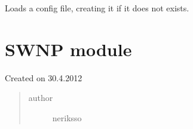 \documentclass[letterpaper,10pt,english]{sphinxmanual}
\begin{document}

\begin{fulllineitems}
\label{state:state.load_config}
Loads a config file, creating it if it does not exists.

\end{fulllineitems}



\section{SWNP module}
\label{swnp::doc}\label{swnp:swnp-module}\label{swnp:module-swnp}
Created on 30.4.2012
\begin{quote}\begin{description}
\item[{author}] \leavevmode
neriksso

\end{description}\end{quote}
\end{document}

